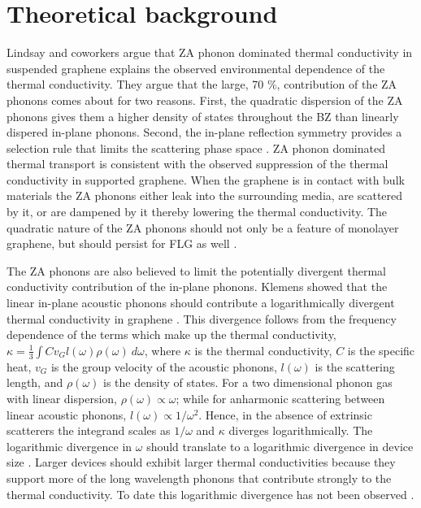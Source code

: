 \section{Theoretical background}
Lindsay and coworkers argue that ZA phonon dominated thermal conductivity in suspended graphene explains the observed environmental dependence of the thermal conductivity.
They argue that the large, 70 \%, contribution of the ZA phonons comes about for two reasons.
First, the quadratic dispersion of the ZA phonons gives them a higher density of states throughout the BZ than linearly dispered in-plane phonons.
Second, the in-plane reflection symmetry provides a selection rule that limits the scattering phase space \cite{Lindsay2010}.
ZA phonon dominated thermal transport is consistent with the observed suppression of the thermal conductivity in supported graphene.
When the graphene is in contact with bulk materials the ZA phonons either leak into the surrounding media, are scattered by it, or are dampened by it thereby lowering the thermal conductivity.
The quadratic nature of the ZA phonons should not only be a feature of monolayer graphene, but should persist for FLG as well \cite{Lindsay2011}.

The ZA phonons are also believed to limit the potentially divergent thermal conductivity contribution of the in-plane phonons.
Klemens showed that the linear in-plane acoustic phonons should contribute a logarithmically divergent thermal conductivity in graphene \cite{Klemens2001}.
This divergence follows from the frequency dependence of the terms which make up the thermal conductivity, $\kappa=\frac{1}{3} \int C v_G l(\omega) \rho(\omega) \ d\omega $, where $\kappa$ is the thermal conductivity, $C$ is the specific heat, $v_G$ is the group velocity of the acoustic phonons, $l(\omega)$ is the scattering length, and $\rho(\omega)$ is the density of states.
For a two dimensional phonon gas with linear dispersion, $\rho(\omega) \propto \omega$; while for anharmonic scattering between linear acoustic phonons, $l(\omega) \propto 1/\omega^2$.
Hence, in the absence of extrinsic scatterers the integrand scales as $1/\omega$ and $\kappa$ diverges logarithmically.
The logarithmic divergence in $\omega$ should translate to a logarithmic divergence in device size \cite{Klemens2001}.
Larger devices should exhibit larger thermal conductivities because they support more of the long wavelength phonons that contribute strongly to the thermal conductivity.
To date this logarithmic divergence has not been observed \cite{Chen2011a}.

